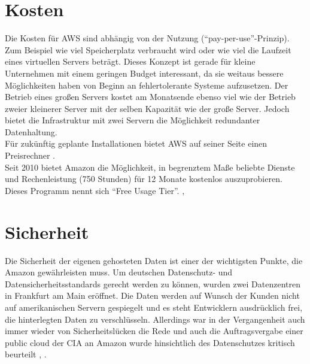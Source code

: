\section{Kosten}
Die Kosten für AWS sind abhängig von der Nutzung ("`pay-per-use"'-Prinzip). Zum Beispiel wie viel Speicherplatz verbraucht wird oder wie viel die Laufzeit eines virtuellen Servers beträgt. Dieses Konzept ist gerade für kleine Unternehmen mit einem geringen Budget interessant, da sie weitaus bessere Möglichkeiten haben von Beginn an fehlertolerante Systeme aufzusetzen. Der Betrieb eines großen Servers kostet am Monatsende ebenso viel wie der Betrieb zweier kleinerer Server mit der selben Kapazität wie der große Server. Jedoch bietet die Infrastruktur mit zwei Servern die Möglichkeit redundanter Datenhaltung.
\\Für zukünftig geplante Installationen bietet AWS auf seiner Seite einen Preisrechner \cite{aws:calc}.
\\ Seit 2010 bietet Amazon die Möglichkeit, in begrenztem Maße beliebte Dienste und Rechenleistung (750 Stunden) für 12 Monate kostenlos auszuprobieren. Dieses Programm nennt sich "`Free Usage Tier"'. \cite{wikipedia:aws}, \cite{wittig:awsinaction}

\section{Sicherheit}
Die Sicherheit der eigenen gehosteten Daten ist einer der wichtigsten Punkte, die Amazon gewährleisten muss. Um deutschen Datenschutz- und Datensicherheitsstandards gerecht werden zu können, wurden zwei Datenzentren in Frankfurt am Main eröffnet. Die Daten werden auf Wunsch der Kunden nicht auf amerikanischen Servern gespiegelt und es steht Entwicklern ausdrücklich frei, die hinterlegten Daten zu verschlüsseln. Allerdings war in der Vergangenheit auch immer wieder von Sicherheitslücken die Rede und auch die Auftragsvergabe einer public cloud der CIA an Amazon wurde hinsichtlich des Datenschutzes kritisch beurteilt \cite{computerwoche:sicherheit}, \cite{sueddt:cia}.

